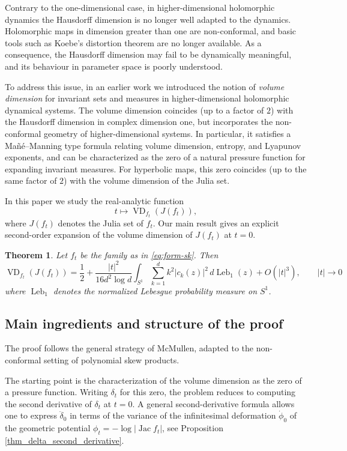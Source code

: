 \documentclass[11pt]{amsart}
\theoremstyle{plain}
\newtheorem{thm}{Theorem}[section]
\theoremstyle{definition}
\theoremstyle{remark}
\DeclareMathOperator{\VD}{VD}
\DeclareMathOperator{\Jac}{Jac}
\DeclareMathOperator{\Leb}{Leb}
\begin{document}
Contrary to the one-dimensional case, in higher-dimensional holomorphic dynamics
 the Hausdorff dimension is no
longer well adapted to the dynamics. 
Holomorphic maps in dimension greater than one are
non-conformal, and basic tools such as Koebe’s distortion theorem are no longer available.
As a consequence, the Hausdorff dimension may fail to be dynamically meaningful, and its
behaviour in parameter space is poorly understood.

To address this issue, in an earlier work \cite{BHMane} we introduced the notion of
\emph{volume dimension} for invariant sets and measures in higher-dimensional holomorphic
dynamical systems. The volume dimension coincides 
(up to a factor  of $2$)
with the Hausdorff dimension in complex
dimension one, but incorporates the non-conformal geometry of higher-dimensional systems.
In particular, it satisfies a Mañé--Manning type formula relating volume dimension,
entropy, and Lyapunov exponents, and can be characterized as the zero of a natural
pressure function for expanding invariant measures. For hyperbolic maps, this zero
coincides 
(up to the same factor of $2$)
with the volume dimension of the Julia set.

In this paper we study the real-analytic function
\[
t \longmapsto \VD_{f_t}(J(f_t)),
\]
where $J(f_t)$ denotes the Julia set of $f_t$.
Our main result 
gives
an explicit second-order expansion
of the volume dimension of $J(f_t)$
at $t=0$.



\begin{thm}\label{thm_main_sk}
Let $f_t$ be the family as in \eqref{eq:form-sk}.
Then
\[
\VD_{f_t}(J(f_t))
=
\frac12
+
\frac{|t|^2}{16 d^2\log d}
\int_{S^1}\sum_{k=1}^d k^2|c_k(z)|^2\,d\Leb_1(z)
+ O(|t|^3),
\qquad |t|\to0
\]
where $\Leb_1$ denotes the normalized 
Lebesgue
probability  measure on $S^1$.
\end{thm}

\subsection*{Main ingredients and structure of the proof}

The proof follows the general strategy of
McMullen, adapted to the
non-conformal setting of polynomial skew products.

The starting point is the characterization of the volume dimension as the zero of a
pressure function. Writing $\delta_t$ for this zero, the problem reduces to computing
the second derivative of $\delta_t$ at $t=0$.
A general second-derivative formula allows  one to
 express
  $\ddot\delta_0$ in terms of the variance of
the infinitesimal deformation $\dot \phi_0$
of the geometric potential $\phi_t = -\log |{\Jac} f_t|$, see 
Proposition
 \ref{thm_delta_second_derivative}.
\end{document}
